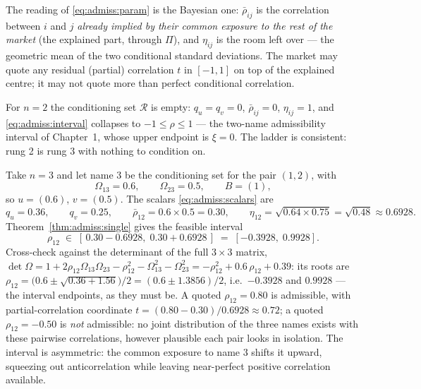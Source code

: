 The reading of \eqref{eq:admiss:param} is the Bayesian one: $\bar\rho_{ij}$
is the correlation between $i$ and $j$ \emph{already implied by their common
exposure to the rest of the market} (the explained part, through
$\Pi$), and $\eta_{ij}$ is the room left over --- the geometric mean of the
two conditional standard deviations. The market may quote any residual
(partial) correlation $t$ in $[-1, 1]$ on top of the explained centre; it
may not quote more than perfect conditional correlation.

\begin{remark}\label{rem:admiss:rung2}
For $n = 2$ the conditioning set $\mathcal{R}$ is empty: $q_u = q_v = 0$,
$\bar\rho_{ij} = 0$, $\eta_{ij} = 1$, and \eqref{eq:admiss:interval}
collapses to $-1 \le \rho \le 1$ --- the two-name admissibility interval of
Chapter~1, whose upper endpoint is $\xi = 0$. The ladder is consistent:
rung 2 is rung 3 with nothing to condition on.
\end{remark}

\begin{example}
\label{ex:admiss:threename}
Take $n = 3$ and let name $3$ be the conditioning set for the pair
$(1, 2)$, with
\[
  \Omega_{13} = 0.6, \qquad \Omega_{23} = 0.5, \qquad B = (1),
\]
so $u = (0.6)$, $v = (0.5)$. The scalars \eqref{eq:admiss:scalars} are
\[
  q_u = 0.36, \qquad q_v = 0.25, \qquad
  \bar\rho_{12} = 0.6 \times 0.5 = 0.30, \qquad
  \eta_{12} = \sqrt{0.64 \times 0.75} = \sqrt{0.48} \approx 0.6928 .
\]
Theorem~\ref{thm:admiss:single} gives the feasible interval
\[
  \rho_{12} \;\in\; [\,0.30 - 0.6928,\; 0.30 + 0.6928\,]
            \;=\; [-0.3928,\; 0.9928] .
\]
Cross-check against the determinant of the full $3 \times 3$ matrix,
$\det \Omega = 1 + 2 \rho_{12} \Omega_{13} \Omega_{23} - \rho_{12}^2 -
\Omega_{13}^2 - \Omega_{23}^2 = -\rho_{12}^2 + 0.6\, \rho_{12} + 0.39$: its
roots are $\rho_{12} = \bigl(0.6 \pm \sqrt{0.36 + 1.56}\bigr)/2 =
(0.6 \pm 1.3856)/2$, i.e.\ $-0.3928$ and $0.9928$ --- the interval
endpoints, as they must be. A quoted $\rho_{12} = 0.80$ is admissible, with
partial-correlation coordinate $t = (0.80 - 0.30)/0.6928 \approx 0.72$; a
quoted $\rho_{12} = -0.50$ is \emph{not} admissible: no joint distribution
of the three names exists with these pairwise correlations, however
plausible each pair looks in isolation. The interval is asymmetric: the
common exposure to name $3$ shifts it upward, squeezing out
anticorrelation while leaving near-perfect positive correlation available.
\end{example}

